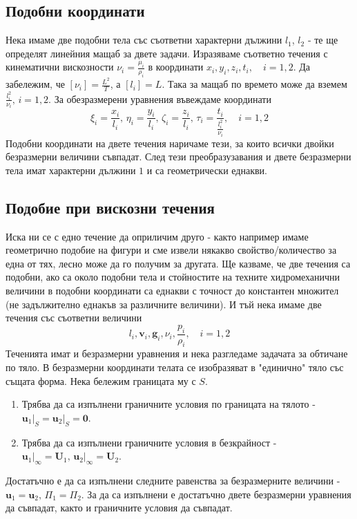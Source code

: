 \documentclass[bulgarian, 12pt]{article}
\begin{document}
\subsection{Подобни координати}
Нека имаме две подобни тела със съответни характерни дължини $l_1$, $l_2$ - те ще определят линейния мащаб за двете задачи. 
Изразяваме съответно течения с кинематични вискозности $\nu_i = \frac{\mu_i}{\rho_i}$ в координати $x_i,y_i,z_i,t_i, \quad i=1,2$.
Да забележим, че $[\nu_i]=\frac{L^2}{T}$, а $[l_i]=L$.
Така за мащаб по времето може да вземем $\frac{l_i^2}{\nu_i},\, i=1,2$. 
За обезразмерени уравнения въвеждаме координати
\begin{equation}
	\xi_i = \frac{x_i}{l_i},\, \eta_i = \frac{y_i}{l_i},\, \zeta_i = \frac{z_i}{l_i},\, \tau_i = \frac{t_i}{\frac{l_i^2}{\nu_i}}, \quad i=1,2
\end{equation}
Подобни координати на двете течения наричаме тези, за които всички двойки безразмерни величини съвпадат.
След тези преобразузавания и двете безразмерни тела имат характерни дължини $1$ и са геометрически еднакви. 
\subsection{Подобие при вискозни течения}
Иска ни се с едно течение да оприличим друго - както например имаме геометрично подобие на фигури и сме извели някакво свойство/количество за една от тях, лесно може да го получим за другата.
Ще казваме, че две течения са подобни, ако са около подобни тела и стойностите на техните хидромеханични величини в подобни координати са еднакви с точност до константен множител (не задължително еднакъв за различните величини). 
И тъй нека имаме две течения със съответни величини 
\begin{equation}
	l_i, \mathbf{v}_i, \mathbf{g}_i, \nu_i, \frac{p_i}{\rho_i}, \quad i=1,2
\end{equation}
Теченията имат и безразмерни уравнения и нека разгледаме задачата за обтичане по тяло. 
В безразмерни координати телата се изобразяват в "единично" тяло със същата форма.
Нека бележим границата му с $S$. 
\begin{enumerate}
	\item Трябва да са изпълнени граничните условия по границата на тялото - $\mathbf{u}_1\vert_S = \mathbf{u}_2\vert_S = \mathbf{0}$.
	\item Трябва да са изпълнени граничните условия в безкрайност - $\mathbf{u}_1\vert_\infty = \mathbf{U}_1,\, \mathbf{u}_2\vert_\infty = \mathbf{U}_2$.
\end{enumerate}
Достатъчно е да са изпълнени следните равенства за безразмерните величини - $\mathbf{u}_1 = \mathbf{u}_2,\, \Pi_1 = \Pi_2$.
За да са изпълнени е достатъчно двете безразмерни уравнения да съвпадат, както и граничните условия да съвпадат.
\end{document}
